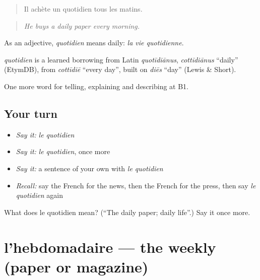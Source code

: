 \begin{quote}
Il achète un quotidien tous les matins.
\end{quote}

\begin{quote}
\emph{He buys a daily paper every morning.}
\end{quote}

As an adjective, \emph{quotidien} means daily: \emph{la vie quotidienne}.

\begin{cousinweb}
\emph{quotidien} is a learned borrowing from Latin \emph{quotīdiānus}, \emph{cottīdiānus} \textquotedblleft{}daily\textquotedblright{} (EtymDB), from \emph{cottīdiē} \textquotedblleft{}every day\textquotedblright{}, built on \emph{diēs} \textquotedblleft{}day\textquotedblright{} (Lewis \& Short).
\end{cousinweb}

\begin{grammarlens}[title={What you've built}]
One more word for telling, explaining and describing at B1.
\end{grammarlens}

\subsection*{Your turn}
\begin{itemize}
\raggedright
  \item \emph{Say it:} \emph{le quotidien}
  \item \emph{Say it:} \emph{le quotidien}, once more
  \item \emph{Say it:} a sentence of your own with \emph{le quotidien}
  \item \emph{Recall:} say the French for the news, then the French for the press, then say \emph{le quotidien} again
\end{itemize}

\begin{tcolorbox}[breakable,colback=teal!4,colframe=teal!35!black,title={Before you move on}]
What does le quotidien mean? (\textquotedblleft{}The daily paper; daily life\textquotedblright{}.) Say it once more.
\end{tcolorbox}
\section[l'hebdomadaire]{l'hebdomadaire — the weekly (paper or magazine)}

\label{lesson:FR-C278-hebdomadaire}



